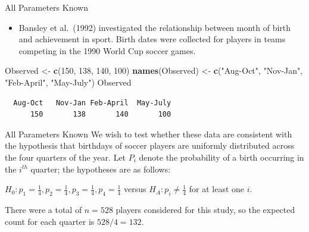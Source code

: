\documentclass[
  ignorenonframetext,
]{beamer}
\newenvironment{Shaded}{\begin{snugshade}}{\end{snugshade}}
\newcommand{\DecValTok}[1]{\textcolor[rgb]{0.00,0.00,0.81}{#1}}
\newcommand{\FunctionTok}[1]{\textcolor[rgb]{0.13,0.29,0.53}{\textbf{#1}}}
\newcommand{\NormalTok}[1]{#1}
\newcommand{\OtherTok}[1]{\textcolor[rgb]{0.56,0.35,0.01}{#1}}
\newcommand{\StringTok}[1]{\textcolor[rgb]{0.31,0.60,0.02}{#1}}
\providecommand{\tightlist}{%
  \setlength{\itemsep}{0pt}\setlength{\parskip}{0pt}}
\begin{document}
\begin{frame}[fragile]{All Parameters Known}
\label{all-parameters-known}
\begin{itemize}
\tightlist
\item
  Bansley et al.~(1992) investigated the relationship between month of
  birth and achievement in sport. Birth dates were collected for players
  in teams competing in the 1990 World Cup soccer games.
\end{itemize}

\begin{Shaded}
\begin{Highlighting}[]
\NormalTok{Observed }\OtherTok{\textless{}{-}} \FunctionTok{c}\NormalTok{(}\DecValTok{150}\NormalTok{, }\DecValTok{138}\NormalTok{, }\DecValTok{140}\NormalTok{, }\DecValTok{100}\NormalTok{)}
\FunctionTok{names}\NormalTok{(Observed) }\OtherTok{\textless{}{-}} \FunctionTok{c}\NormalTok{(}\StringTok{"Aug{-}Oct"}\NormalTok{, }\StringTok{"Nov{-}Jan"}\NormalTok{, }
                     \StringTok{"Feb{-}April"}\NormalTok{, }\StringTok{"May{-}July"}\NormalTok{)}
\NormalTok{Observed}
\end{Highlighting}
\end{Shaded}

\begin{verbatim}
  Aug-Oct   Nov-Jan Feb-April  May-July 
      150       138       140       100 
\end{verbatim}
\end{frame}

\begin{frame}{All Parameters Known}
\label{all-parameters-known-1}
We wish to test whether these data are consistent with the hypothesis
that birthdays of soccer players are uniformly distributed across the
four quarters of the year. Let \(P_i\) denote the probability of a birth
occurring in the \(i^{th}\) quarter; the hypotheses are as follows:

\(H_0: p_1=\frac{1}{4}, p_2=\frac{1}{4}, p_3=\frac{1}{4}, p_4=\frac{1}{4}\)
versus \(H_A: p_i \neq \frac{1}{4}\) for at least one \(i\).

There were a total of \(n = 528\) players considered for this study, so
the expected count for each quarter is \(528/4 = 132\).
\end{frame}
\end{document}
